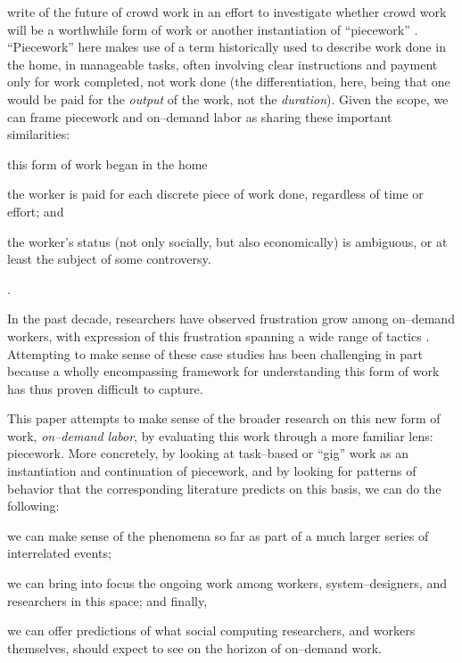 \documentclass{sigchi}
\newcommand{\msb}[1]{{\color{PineGreen}[MSB: #1]}}
\newcommand{\ali}[1]{{\color{BrickRed}[\itshape al2: #1\upshape]}}
\begin{document}
\citeauthor{crowdworkFuture}
write of the future of crowd work in an effort to investigate
whether crowd work will be a worthwhile form of work or another instantiation of ``piecework''
\cite{crowdworkFuture}.
``Piecework'' here makes use of
a term historically used to describe work done in the home,
in manageable tasks,
often involving clear instructions
and payment only for work completed, not work done
(the differentiation, here, being that
one would be paid for the \textit{output} of the work,
not the \textit{duration}).
Given the scope,
we can frame piecework and on--demand labor
as sharing these important similarities:
\begin{inlinelist}
\item this form of work began in the home
\item the worker is paid for each discrete piece of work done, regardless of time or effort; and
\item the worker's status
(not only socially, but also economically)
is ambiguous, or at least the subject of some controversy.
\end{inlinelist}. 

In the past decade, researchers have observed frustration
grow among on--demand workers,
with expression of this frustration spanning a wide range of tactics
\cite{uberAlgorithm,turkopticon,dynamo}.
Attempting to make sense of these case studies has been challenging
in part because
a wholly encompassing framework for understanding this form of work
has thus proven difficult to capture.


This paper attempts to make sense of the broader research on this new form of work,
\textit{on--demand labor}, by evaluating this work through a more familiar lens: piecework.
More concretely, by looking at task--based or ``gig'' work as
an instantiation and continuation of piecework,
and by looking for patterns of behavior that the corresponding literature predicts
on this basis, we can do the following:
\begin{inlinelist}
  \item we can make sense of the phenomena so far as part of a much larger series of interrelated events;
  \item we can bring into focus the ongoing work among workers, system--designers, and researchers in this space; and finally,
  \item we can offer predictions of what social computing researchers, and workers themselves, should expect to see on the horizon of on--demand work.
\end{inlinelist}
\end{document}
